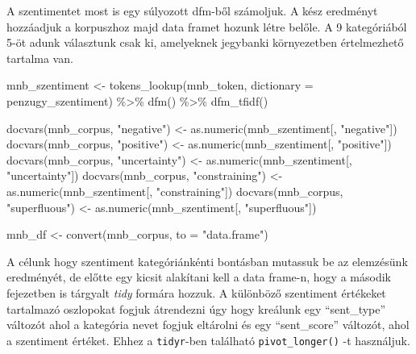 \documentclass[
]{book}
\newenvironment{Shaded}{\begin{snugshade}}{\end{snugshade}}
\newcommand{\AttributeTok}[1]{\textcolor[rgb]{0.77,0.63,0.00}{#1}}
\newcommand{\FunctionTok}[1]{\textcolor[rgb]{0.00,0.00,0.00}{#1}}
\newcommand{\NormalTok}[1]{#1}
\newcommand{\OtherTok}[1]{\textcolor[rgb]{0.56,0.35,0.01}{#1}}
\newcommand{\SpecialCharTok}[1]{\textcolor[rgb]{0.00,0.00,0.00}{#1}}
\newcommand{\StringTok}[1]{\textcolor[rgb]{0.31,0.60,0.02}{#1}}
\begin{document}
A szentimentet most is egy súlyozott dfm-ből számoljuk. A kész eredményt
hozzáadjuk a korpuszhoz majd data framet hozunk létre belőle. A 9
kategóriából 5-öt adunk választunk csak ki, amelyeknek jegybanki
környezetben értelmezhető tartalma van.

\begin{Shaded}
\begin{Highlighting}[]
\NormalTok{mnb\_szentiment }\OtherTok{\textless{}{-}} \FunctionTok{tokens\_lookup}\NormalTok{(mnb\_token, }\AttributeTok{dictionary =}\NormalTok{ penzugy\_szentiment) }\SpecialCharTok{\%\textgreater{}\%}
  \FunctionTok{dfm}\NormalTok{() }\SpecialCharTok{\%\textgreater{}\%}
  \FunctionTok{dfm\_tfidf}\NormalTok{()}



\FunctionTok{docvars}\NormalTok{(mnb\_corpus, }\StringTok{"negative"}\NormalTok{) }\OtherTok{\textless{}{-}} \FunctionTok{as.numeric}\NormalTok{(mnb\_szentiment[, }\StringTok{"negative"}\NormalTok{])}
\FunctionTok{docvars}\NormalTok{(mnb\_corpus, }\StringTok{"positive"}\NormalTok{) }\OtherTok{\textless{}{-}} \FunctionTok{as.numeric}\NormalTok{(mnb\_szentiment[, }\StringTok{"positive"}\NormalTok{])}
\FunctionTok{docvars}\NormalTok{(mnb\_corpus, }\StringTok{"uncertainty"}\NormalTok{) }\OtherTok{\textless{}{-}} \FunctionTok{as.numeric}\NormalTok{(mnb\_szentiment[, }\StringTok{"uncertainty"}\NormalTok{])}
\FunctionTok{docvars}\NormalTok{(mnb\_corpus, }\StringTok{"constraining"}\NormalTok{) }\OtherTok{\textless{}{-}} \FunctionTok{as.numeric}\NormalTok{(mnb\_szentiment[, }\StringTok{"constraining"}\NormalTok{])}
\FunctionTok{docvars}\NormalTok{(mnb\_corpus, }\StringTok{"superfluous"}\NormalTok{) }\OtherTok{\textless{}{-}} \FunctionTok{as.numeric}\NormalTok{(mnb\_szentiment[, }\StringTok{"superfluous"}\NormalTok{])}


\NormalTok{mnb\_df }\OtherTok{\textless{}{-}} \FunctionTok{convert}\NormalTok{(mnb\_corpus, }\AttributeTok{to =} \StringTok{"data.frame"}\NormalTok{)}
\end{Highlighting}
\end{Shaded}

A célunk hogy szentiment kategóriánkénti bontásban mutassuk be az
elemzésünk eredményét, de előtte egy kicsit alakítani kell a data
frame-n, hogy a második fejezetben is tárgyalt \emph{tidy} formára
hozzuk. A különböző szentiment értékeket tartalmazó oszlopokat fogjuk
átrendezni úgy hogy kreálunk egy ``sent\_type'' változót ahol a
kategória nevet fogjuk eltárolni és egy ``sent\_score'' változót, ahol a
szentiment értéket. Ehhez a \texttt{tidyr}-ben található
\texttt{pivot\_longer()} -t használjuk.
\end{document}
